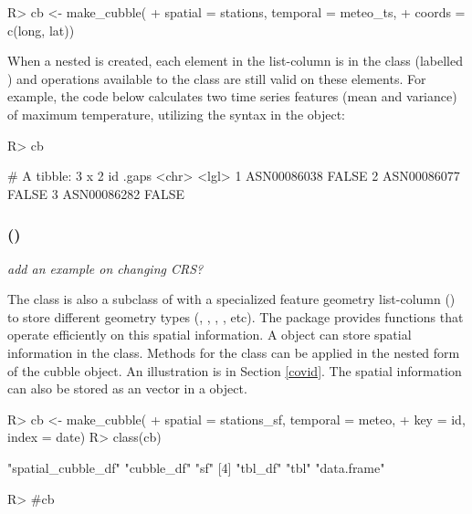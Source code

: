 \documentclass[
  shortnames]{jss}
\begin{document}
\begin{CodeChunk}
\begin{CodeInput}
R> cb <- make_cubble(
+   spatial = stations, temporal = meteo_ts, 
+   coords = c(long, lat))
\end{CodeInput}
\end{CodeChunk}

When a nested  is created, each element in the list-column  is in the  class (labelled ) and operations available to the  class are still valid on these elements. For example, the code below calculates two time series features (mean and variance) of maximum temperature, utilizing the  syntax in the  object:

\begin{CodeChunk}
\begin{CodeInput}
R> cb %
\end{CodeInput}
\begin{CodeOutput}
# A tibble: 3 x 2
  id          .gaps
  <chr>       <lgl>
1 ASN00086038 FALSE
2 ASN00086077 FALSE
3 ASN00086282 FALSE
\end{CodeOutput}
\end{CodeChunk}

\subsubsection[]{ ()}

\emph{add an example on changing CRS?}

The  class is also a subclass of  with a specialized feature geometry list-column () to store different geometry types (, , , , etc). The package  provides functions that operate efficiently on this spatial information. A  object can store spatial information in the  class. Methods for the  class can be applied in the nested form of the cubble object. An illustration is in Section \ref{covid}. The spatial information can also be stored as an  vector in a  object.

\begin{CodeChunk}
\begin{CodeInput}
R> cb <- make_cubble(
+   spatial = stations_sf, temporal = meteo, 
+   key = id, index = date)
R> class(cb)
\end{CodeInput}
\begin{CodeOutput}
[1] "spatial_cubble_df" "cubble_df"         "sf"               
[4] "tbl_df"            "tbl"               "data.frame"       
\end{CodeOutput}
\begin{CodeInput}
R> #cb %
\end{CodeInput}
\end{CodeChunk}
\end{document}
